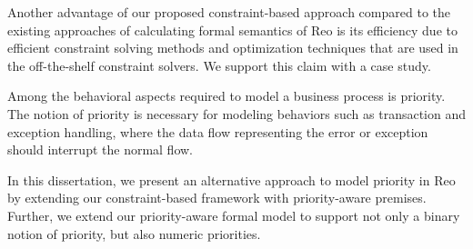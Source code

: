 Another advantage of our proposed constraint-based approach compared to the existing approaches of calculating formal semantics of Reo is its efficiency due to efficient constraint solving methods and optimization techniques that are used in the off-the-shelf constraint solvers. We support this claim with a case study.

Among the behavioral aspects required to model a business process is {priority}. The notion of priority is necessary for modeling behaviors such as transaction and exception handling, where the data flow representing the error or exception should interrupt the normal flow. 

In this dissertation, we present an alternative approach to model priority in Reo by extending our constraint-based framework with priority-aware premises. Further, we extend our priority-aware formal model to support not only a binary notion of priority, but also numeric priorities. 

